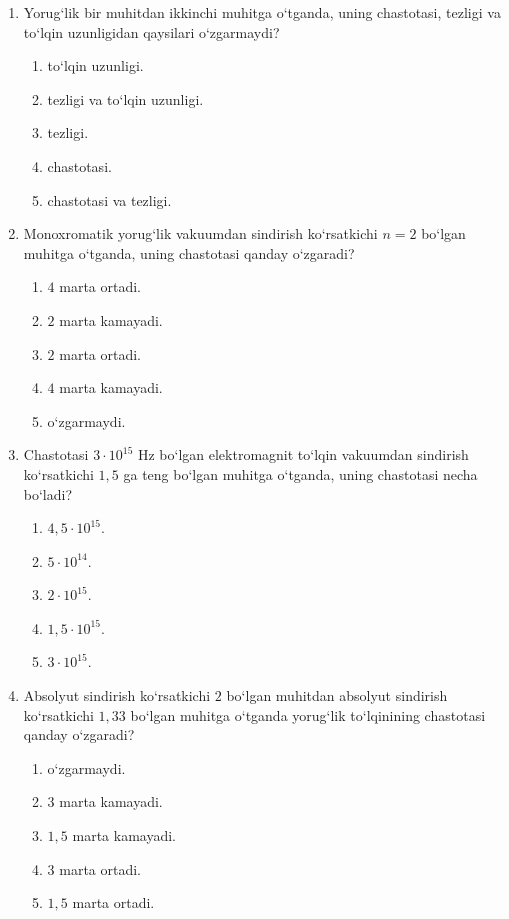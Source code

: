 \begin{enumerate}
\item Yorug‘lik bir muhitdan ikkinchi muhitga o‘tganda, uning chastotasi, tezligi va to‘lqin uzunligidan qaysilari o‘zgarmaydi?
\begin{enumerate}[label=\Alph*)]
\item to‘lqin uzunligi.
\item tezligi va to‘lqin uzunligi.
\item tezligi.
\item chastotasi.
\item chastotasi va tezligi.
\end{enumerate}

\item Monoxromatik yorug‘lik vakuumdan sindirish ko‘rsatkichi $n=2$ bo‘lgan muhitga o‘tganda, uning chastotasi qanday o‘zgaradi?
\begin{enumerate}[label=\Alph*)]
\item $4$ marta ortadi.
\item $2$ marta kamayadi.
\item $2$ marta ortadi.
\item $4$ marta kamayadi.
\item o‘zgarmaydi.
\end{enumerate}

\item Chastotasi $3\cdot10^{15}$ Hz bo‘lgan elektromagnit to‘lqin vakuumdan sindirish ko‘rsatkichi $1,5$ ga teng bo‘lgan muhitga o‘tganda, uning chastotasi necha bo‘ladi?
\begin{enumerate}[label=\Alph*)]
\item $4,5\cdot10^{15}$.
\item $5\cdot10^{14}$.
\item $2\cdot10^{15}$.
\item $1,5\cdot10^{15}$.
\item $3\cdot10^{15}$.
\end{enumerate}

\item Absolyut sindirish ko‘rsatkichi $2$ bo‘lgan muhitdan absolyut sindirish ko‘rsatkichi $1,33$ bo‘lgan muhitga o‘tganda yorug‘lik to‘lqinining chastotasi qanday o‘zgaradi?
\begin{enumerate}[label=\Alph*)]
\item o‘zgarmaydi.
\item $3$ marta kamayadi.
\item $1,5$ marta kamayadi.
\item $3$ marta ortadi.
\item $1,5$ marta ortadi.
\end{enumerate}


\end{enumerate}
